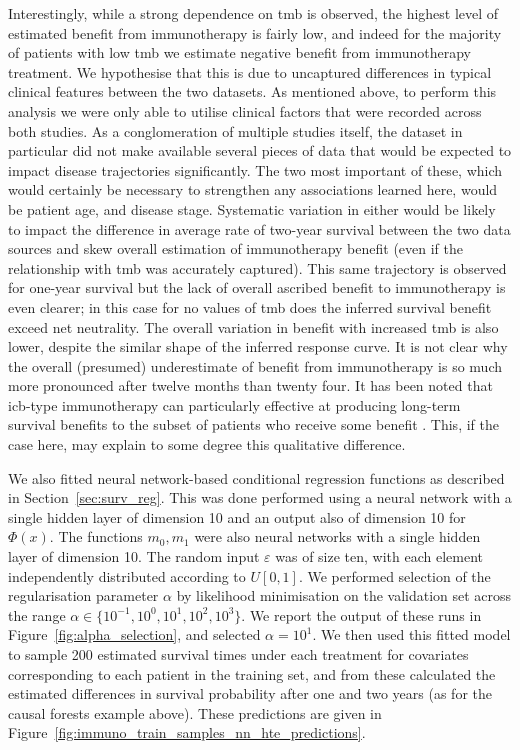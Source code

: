 \documentclass[../thesis.tex]{subfiles}
\begin{document}
Interestingly, while a strong dependence on \gls{tmb} is observed, the highest level of estimated benefit from immunotherapy is fairly low, and indeed for the majority of patients with low \gls{tmb} we estimate negative benefit from immunotherapy treatment. We hypothesise that this is due to uncaptured differences in typical clinical features between the two datasets. As mentioned above, to perform this analysis we were only able to utilise clinical factors that were recorded across both studies. As a conglomeration of multiple studies itself, the \citet{zehir_mutational_2017} dataset in particular did not make available several pieces of data that would be expected to impact disease trajectories significantly. The two most important of these, which would certainly be necessary to strengthen any associations learned here, would be patient age, and disease stage. Systematic variation in either would be likely to impact the difference in average rate of two-year survival between the two data sources and skew overall estimation of immunotherapy benefit (even if the relationship with \gls{tmb} was accurately captured). This same trajectory is observed for one-year survival but the lack of overall ascribed benefit to immunotherapy is even clearer; in this case for no values of \gls{tmb} does the inferred survival benefit exceed net neutrality. The overall variation in benefit with increased \gls{tmb} is also lower, despite the similar shape of the inferred response curve. It is not clear why the overall (presumed) underestimate of benefit from immunotherapy is so much more pronounced after twelve months than twenty four. It has been noted that \gls{icb}-type immunotherapy can particularly effective at producing long-term survival benefits to the subset of patients who receive some benefit \citep{putzu_duration_2023}. This, if the case here, may explain to some degree this qualitative difference. 

We also fitted neural network-based conditional regression functions as described in Section~\ref{sec:surv_reg}. This was done performed using a neural network with a single hidden layer of dimension 10 and an output also of dimension 10 for $\Phi(x)$. The functions $m_0,m_1$ were also neural networks with a single hidden layer of dimension 10. The random input $\varepsilon$ was of size ten, with each element independently distributed according to $U[0,1]$. We performed selection of the regularisation parameter $\alpha$ by likelihood minimisation on the validation set across the range $\alpha \in \{10^{-1}, 10^{0}, 10^1, 10^2, 10^3\}$. We report the output of these runs in Figure~\ref{fig:alpha_selection}, and selected $\alpha = 10^1$. We then used this fitted model to sample 200 estimated survival times under each treatment for covariates corresponding to each patient in the training set, and from these calculated the estimated differences in survival probability after one and two years (as for the causal forests example above). These predictions are given in Figure~\ref{fig:immuno_train_samples_nn_hte_predictions}.
\end{document}
